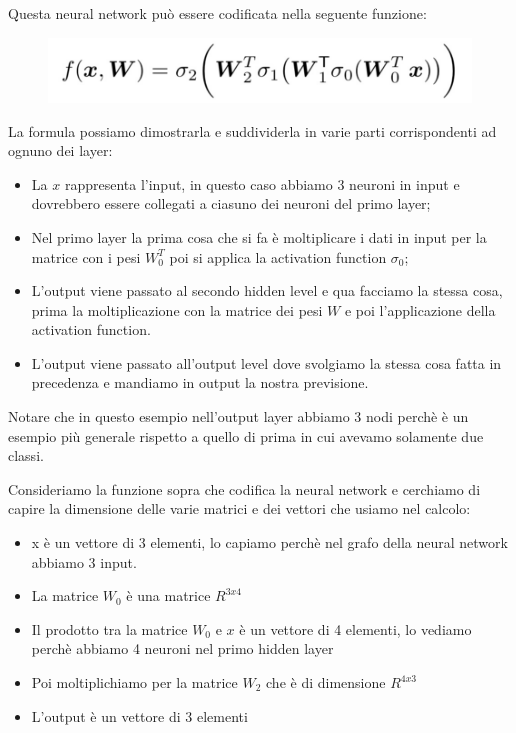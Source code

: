 \documentclass[14pt]{extreport}
\begin{document}
Questa neural network può essere codificata nella seguente funzione:

\begin{figure}[H]
\centering
\includegraphics[width=0.7\linewidth]{369.jpeg}
\end{figure}


La formula possiamo dimostrarla e suddividerla in varie parti corrispondenti ad ognuno dei layer:
\begin{itemize}
\item La $x$ rappresenta l'input, in questo caso abbiamo 3 neuroni in input e dovrebbero essere collegati a ciasuno dei neuroni del primo layer;
\item Nel primo layer la prima cosa che si fa è moltiplicare i dati in input per la matrice con i pesi $W_0^T$ poi si applica la activation function
$\sigma_0$;
\item L'output viene passato al secondo hidden level e qua facciamo la stessa cosa, prima la moltiplicazione con la matrice dei pesi $W$ e poi
l'applicazione della activation function.
\item L'output viene passato all'output level dove svolgiamo la stessa cosa fatta in precedenza e mandiamo in output la nostra previsione.
\end{itemize}

Notare che in questo esempio nell'output layer abbiamo 3 nodi perchè è un esempio più generale rispetto a quello di prima in cui avevamo solamente due
classi.

Consideriamo la funzione sopra che codifica la neural network e cerchiamo di capire la dimensione delle varie matrici e dei vettori che usiamo nel
calcolo:

\begin{itemize}
\item x è un vettore di 3 elementi, lo capiamo perchè nel grafo della neural network abbiamo 3 input.
\item La matrice $W_0$ è una matrice $R^{3x4}$
\item Il prodotto tra la matrice $W_0$ e $x$ è un vettore di 4 elementi, lo vediamo perchè abbiamo 4 neuroni nel primo hidden layer
\item Poi moltiplichiamo per la matrice $W_2$ che è di dimensione $R^{4x3}$
\item L'output è un vettore di 3 elementi
\end{itemize}
\end{document}

